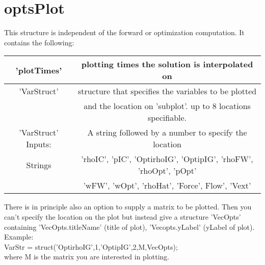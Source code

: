 \documentclass[11pt, a4paper]{article}
\theoremstyle{definition}
\begin{document}
\section{optsPlot}
This structure is independent of the forward or optimization computation. It contains the following:

\begin{center}
	\begin{tabular}{ | c | c |}
		\hline
         'plotTimes' & plotting times the solution is interpolated on\\
		\hline
		 'VarStruct' & structure that specifies the variables to be plotted \\
		 & and the location on 'subplot'. up to 8 locations specifiable. \\
		 'VarStruct' Inputs: & A string followed by a number to specify the location\\
		 Strings & 'rhoIC', 'pIC', 'OptirhoIG', 'OptipIG', 'rhoFW', 'rhoOpt', 'pOpt'\\
		 & 'wFW', 'wOpt', 'rhoHat', 'Force', Flow', 'Vext'\\
		 \hline
	\end{tabular}
\end{center}
There is in principle also an option to supply a matrix to be plotted. Then you can't specify the location on the plot but instead give a structure 'VecOpts' containing 'VecOpts.titleName' (title of plot), 'Vecopts.yLabel' (yLabel of plot).\\
Example:\\
VarStr = struct('OptirhoIG',1,'OptipIG',2,M,VecOpts);\\
where M is the matrix you are interested in plotting.
	
\end{document}
